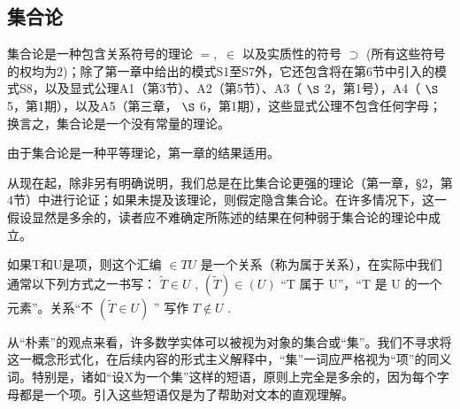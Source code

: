 \subsection{集合论}

集合论是一种包含关系符号的理论 \(=,\) \(\in\) 以及实质性的符号 \(\supset\) (所有这些符号的权均为2)；除了第一章中给出的模式S1至S7外，它还包含将在第6节中引入的模式S8，以及显式公理A1（第3节）、A2（第5节）、A3（ \(\S\) 2，第1号），A4（ \(\S\) 5，第1期），以及A5（第三章， \(\S\) 6，第1期），这些显式公理不包含任何字母；换言之，集合论是一个没有常量的理论。

由于集合论是一种平等理论，第一章的结果适用。

从现在起，除非另有明确说明，我们总是在比集合论更强的理论（第一章，§2，第4节）中进行论证；如果未提及该理论，则假定隐含集合论。在许多情况下，这一假设显然是多余的，读者应不难确定所陈述的结果在何种弱于集合论的理论中成立。

如果T和U是项，则这个汇编 \(\in TU\) 是一个关系（称为属于关系），在实际中我们通常以下列方式之一书写： \(\widetilde{T} \in U\) , \((\widetilde{T}) \in (U)\) “T 属于 U”，“T 是 U 的一个元素”。关系“不 \((\widetilde{T} \in U)\) '' 写作 \(T \notin U\) .

从“朴素”的观点来看，许多数学实体可以被视为对象的集合或“集”。我们不寻求将这一概念形式化，在后续内容的形式主义解释中，“集”一词应严格视为“项”的同义词。特别是，诸如“设X为一个集”这样的短语，原则上完全是多余的，因为每个字母都是一个项。引入这些短语仅是为了帮助对文本的直观理解。

